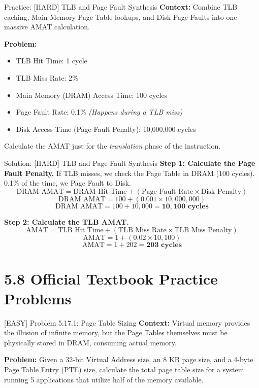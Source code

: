 \documentclass[aspectratio=169]{beamer}
\begin{document}
\begin{frame}{Practice: [HARD] TLB and Page Fault Synthesis}
\textbf{Context:} Combine TLB caching, Main Memory Page Table lookups, and Disk Page Faults into one massive AMAT calculation.

\vspace{0.5cm}
\textbf{Problem:} 
\begin{itemize}
    \item TLB Hit Time: 1 cycle
    \item TLB Miss Rate: 2\%
    \item Main Memory (DRAM) Access Time: 100 cycles
    \item Page Fault Rate: 0.1\% \textit{(Happens during a TLB miss)}
    \item Disk Access Time (Page Fault Penalty): 10,000,000 cycles
\end{itemize}

\vspace{0.5cm}
Calculate the AMAT just for the \textit{translation} phase of the instruction.
\end{frame}

\begin{frame}{Solution: [HARD] TLB and Page Fault Synthesis}
\textbf{Step 1: Calculate the Page Fault Penalty.}
If TLB misses, we check the Page Table in DRAM (100 cycles). 0.1\% of the time, we Page Fault to Disk.
\[ \text{DRAM AMAT} = \text{DRAM Hit Time} + (\text{Page Fault Rate} \times \text{Disk Penalty}) \]
\[ \text{DRAM AMAT} = 100 + (0.001 \times 10,000,000) \]
\[ \text{DRAM AMAT} = 100 + 10,000 = \mathbf{10,100 \text{ cycles}} \]

\vspace{0.5cm}
\textbf{Step 2: Calculate the TLB AMAT.}
\[ \text{AMAT} = \text{TLB Hit Time} + (\text{TLB Miss Rate} \times \text{TLB Miss Penalty}) \]
\[ \text{AMAT} = 1 + (0.02 \times 10,100) \]
\[ \text{AMAT} = 1 + 202 = \mathbf{203 \text{ cycles}} \]
\end{frame}

\section{5.8 Official Textbook Practice Problems}

\begin{frame}{[EASY] Problem 5.17.1: Page Table Sizing}
\textbf{Context:} Virtual memory provides the illusion of infinite memory, but the Page Tables themselves must be physically stored in DRAM, consuming actual memory.
\vspace{0.5cm}

\textbf{Problem:}
Given a 32-bit Virtual Address size, an 8 KB page size, and a 4-byte Page Table Entry (PTE) size, calculate the total page table size for a system running 5 applications that utilize half of the memory available.
\end{frame}
\end{document}

